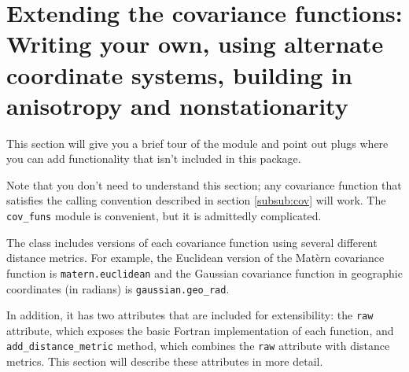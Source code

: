 \documentclass[]{manual}
\begin{document}
% 

\section{Extending the covariance functions: Writing your own, using alternate coordinate systems, building in anisotropy and nonstationarity}\label{sec:usercov} 
This section will give you a brief tour of the  module and point out plugs where you can add functionality that isn't included in this package. 

\bigskip
Note that you don't need to understand this section; any covariance function that satisfies the calling convention described in section \ref{subsub:cov} will work. The \texttt{cov_funs} module is convenient, but it is admittedly complicated.

\bigskip
The  class includes versions of each covariance function using several different distance metrics. For example, the Euclidean version of the Mat\`ern covariance function is \texttt{matern.euclidean} and the Gaussian covariance function in geographic coordinates (in radians) is \texttt{gaussian.geo_rad}. 

In addition, it has two attributes that are included for extensibility: the \texttt{raw} attribute, which exposes the basic Fortran implementation of each function, and \texttt{add_distance_metric} method, which combines the \texttt{raw} attribute with distance metrics. This section will describe these attributes in more detail.
\end{document}
